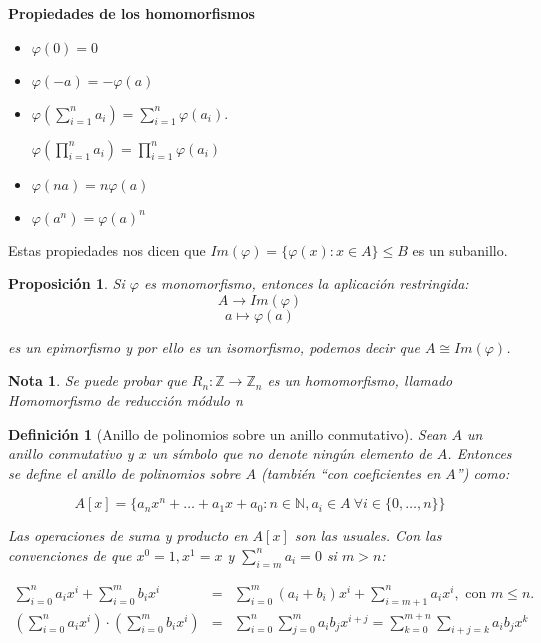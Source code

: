 \documentclass[11pt, a4paper, titlepage]{article}
\providecommand{\ent}{\mathbb{Z}}
\theoremstyle{theorem-style}
\newtheorem*{nprop}{Proposición}
\theoremstyle{definition-style}
\newtheorem*{ndef}{Definición}
\theoremstyle{remark-style}
\newtheorem*{nota}{Nota}
\theoremstyle{example-style}
\begin{document}
\textbf{Propiedades de los homomorfismos}

\begin{itemize}

\item $\varphi(0) = 0$

\item $\varphi(-a) = -\varphi(a) $

\item $\varphi(\sum_{i = 1}^n a_i) = \sum_{i = 1}^n\varphi(a_i)$. 

$\varphi(\prod_{i = 1}^n a_i) = \prod_{i = 1}^n\varphi(a_i)$

\item $\varphi(na) = n\varphi(a)$

\item $\varphi(a^n) = \varphi(a)^n$
	
\end{itemize}


Estas propiedades nos dicen que $Im(\varphi) = \{ \varphi(x): x \in A\} \leq B$ es un subanillo.

\begin{nprop}
	Si $\varphi$ es monomorfismo, entonces la aplicación restringida:
\[
A \to Im(\varphi)\]
\[
a \mapsto \varphi(a)
\]

es un epimorfismo y por ello es un isomorfismo, podemos decir que $A \cong Im(\varphi)$.\\
\end{nprop}


\begin{nota}
	Se puede probar que $R_n: \ent \to \ent_n$ es un homomorfismo, llamado \emph{Homomorfismo de reducción módulo n}\\
\end{nota}

\begin{ndef}[Anillo de polinomios sobre un anillo conmutativo]
  Sean $A$ un anillo conmutativo y $x$ un símbolo que no denote ningún elemento de $A$. Entonces se define el anillo de polinomios sobre $A$ (también ``con coeficientes en $A$'') como:

  \[
       A[x] = \{ a_nx^n + \dots + a_1x + a_0 : n \in \mathbb{N}, a_i \in A \ \forall i \in \{0, \dots, n\} \}
  \]

  Las operaciones de suma y producto en $A[x]$ son las usuales. Con las convenciones de que $x^0 = 1, x^1 = x$ y $\sum_{i=m}^n a_i = 0$ si $m>n$:

  \[
  \begin{array}{lllll}
    \sum_{i=0}^n a_ix^i + \sum_{i=0}^m b_ix^i & = & \sum_{i=0}^m (a_i + b_i)x^i + \sum_{i=m+1}^n a_ix^i, \text{ con $m \le n$.} & & \\
    \left(\sum_{i=0}^n a_ix^i\right) \cdot \left(\sum_{i=0}^m b_ix^i\right) & = & \sum_{i=0}^n \sum_{j=0}^m a_i b_j x^{i+j} =  \sum_{k=0}^{m+n} \sum_{i+j=k} a_ib_j x^k
  \end{array}
  \]
  
\end{ndef}
\end{document}
